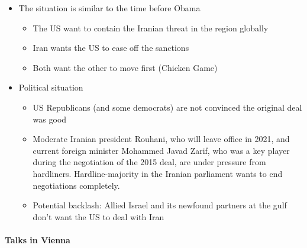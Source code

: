 \begin{itemize}
    \item The situation is similar to the time before Obama
        \begin{itemize}
            \item The US want to contain the Iranian threat in the region
                globally
            \item Iran wants the US to ease off the sanctions
            \item Both want the other to move first (Chicken Game)
        \end{itemize}
    \item Political situation
        \begin{itemize}
            \item US Republicans (and some democrats) are not convinced the
                original deal was good
            \item Moderate Iranian president Rouhani, who will leave office
                in 2021, and current foreign minister Mohammed Javad Zarif,
                who was a key player during the negotiation of the 2015 deal,
                are under pressure from hardliners. Hardline-majority in the
                Iranian parliament wants to end negotiations completely.
            \item Potential backlash: Allied Israel and its newfound partners
                at the gulf don't want the US to deal with Iran
        \end{itemize}
\end{itemize}

\paragraph{Talks in Vienna}

